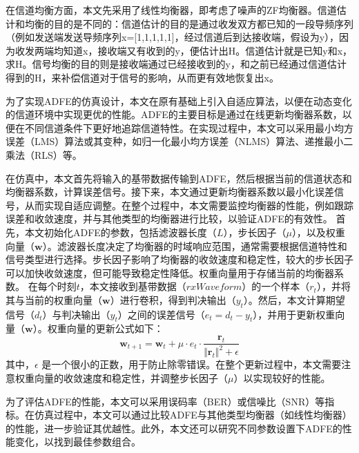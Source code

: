 \documentclass[UTF8,a4paper,12pt]{ctexart}
\numberwithin{equation}{section}
\begin{document}
在信道均衡方面，本文先采用了线性均衡器，即考虑了噪声的ZF均衡器。信道估计和均衡的目的是不同的：信道估计的目的是通过收发双方都已知的一段导频序列（例如发送端发送导频序列x=[1,1,1,1,1]，经过信道后到达接收端，假设为y），因为收发两端均知道x，接收端又有收到的y，便估计出H。信道估计就是已知y和x，求H。信号均衡的目的则是接收端通过已经接收到的y，和之前已经通过信道估计得到的H，来补偿信道对于信号的影响，从而更有效地恢复出x。

为了实现ADFE的仿真设计，本文在原有基础上引入自适应算法，以便在动态变化的信道环境中实现更优的性能。ADFE的主要目标是通过在线更新均衡器系数，以便在不同信道条件下更好地追踪信道特性。在实现过程中，本文可以采用最小均方误差（LMS）算法或其变种，如归一化最小均方误差（NLMS）算法、递推最小二乘法（RLS）等。

在仿真中，本文首先将输入的基带数据传输到ADFE，然后根据当前的信道状态和均衡器系数，计算误差信号。接下来，本文通过更新均衡器系数以最小化误差信号，从而实现自适应调整。在整个过程中，本文需要监控均衡器的性能，例如跟踪误差和收敛速度，并与其他类型的均衡器进行比较，以验证ADFE的有效性。
首先，本文初始化ADFE的参数，包括滤波器长度（$L$），步长因子（$\mu$），以及权重向量（$\boldsymbol{w}$）。滤波器长度决定了均衡器的时域响应范围，通常需要根据信道特性和信号类型进行选择。步长因子影响了均衡器的收敛速度和稳定性，较大的步长因子可以加快收敛速度，但可能导致稳定性降低。权重向量用于存储当前的均衡器系数。
在每个时刻$t$，本文接收到基带数据（$\textit{rxWaveform}$）的一个样本（$r_t$），并将其与当前的权重向量（$\boldsymbol{w}$）进行卷积，得到判决输出（$y_t$）。然后，本文计算期望信号（$d_t$）与判决输出（$y_t$）之间的误差信号（$e_t = d_t - y_t$），并用于更新权重向量（$\boldsymbol{w}$）。权重向量的更新公式如下：
\begin{equation}
	\boldsymbol{w}_{t+1} = \boldsymbol{w}_t + \mu \cdot e_t \cdot \frac{\boldsymbol{r}_t}{\Vert \boldsymbol{r}_t \Vert^2 + \epsilon}
\end{equation}
其中，$\epsilon$ 是一个很小的正数，用于防止除零错误。在整个更新过程中，本文需要注意权重向量的收敛速度和稳定性，并调整步长因子（$\mu$）以实现较好的性能。

为了评估ADFE的性能，本文可以采用误码率（BER）或信噪比（SNR）等指标。在仿真过程中，本文可以通过比较ADFE与其他类型均衡器（如线性均衡器）的性能，进一步验证其优越性。此外，本文还可以研究不同参数设置下ADFE的性能变化，以找到最佳参数组合。
\end{document}
